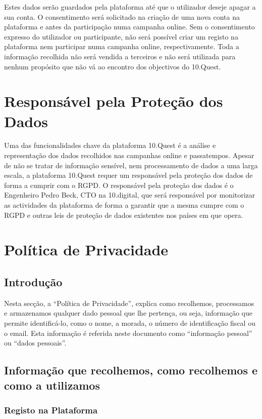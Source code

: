 Estes dados serão guardados pela plataforma até que o utilizador deseje apagar a sua conta. O consentimento será solicitado na criação de uma nova conta na plataforma e antes da participação numa campanha online. Sem o consentimento expresso do utilizador ou participante, não será possível criar um registo na plataforma nem participar numa campanha online, respectivamente. Toda a informação recolhida não será vendida a terceiros e não será utilizada para nenhum propósito que não vá ao encontro dos objectivos do 10.Quest.

\section{Responsável pela Proteção dos Dados}

Uma das funcionalidades chave da plataforma 10.Quest é a análise e representação dos dados recolhidos nas campanhas online e passatempos. Apesar de não se tratar de informação sensível, nem processamento de dados a uma larga escala, a plataforma 10.Quest requer um responsável pela proteção dos dados de forma a cumprir com o RGPD. O responsável pela proteção dos dados é o Engenheiro Pedro Beck, CTO na 10.digital, que será responsável por monitorizar as actividades da plataforma de forma a garantir que a mesma cumpre com o RGPD e outras leis de proteção de dados existentes nos países em que opera.

\section{Política de Privacidade}

\subsection{Introdução}

Nesta secção, a “Política de Privacidade”, explica como recolhemos, processamos e armazenamos qualquer dado pessoal que lhe pertença, ou seja, informação que permite identificá-lo, como o nome, a morada, o número de identificação fiscal ou o email. Esta informação é referida neste documento como “informação pessoal” ou “dados pessoais”.

\subsection{Informação que recolhemos, como recolhemos e como a utilizamos}

\subsubsection{Registo na Plataforma}

